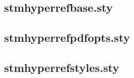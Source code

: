 \documentclass[%
  type=article,%
  layout=koma,%
  conditionallox=true,%
  conditionalloxnewpage=false,%
  date=true,%
  index=true,%
  listings=true%
]{stmtext}
\begin{document}


\subsection{stmhyperrefbase.sty}
\label{sec:code:base}



\subsection{stmhyperrefpdfopts.sty}
\label{sec:code:pdfopts}



\subsection{stmhyperrefstyles.sty}
\label{sec:code:styles}


\end{document}

